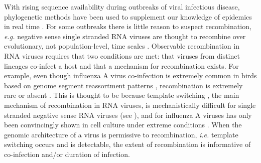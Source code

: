 \documentclass[11pt,oneside,letterpaper]{article}
\begin{document}
With rising sequence availability during outbreaks of viral infectious disease, phylogenetic methods have been used to supplement our knowledge of epidemics in real time \citep{smith_2009,rambaut_2009,lemey_2009,drosten_2013,cotten_2013,cotten_2014,drosten_2014,gire_2014}.
For some outbreaks there is little reason to suspect recombination, \textit{e.g.} negative sense single stranded RNA viruses are thought to recombine over evolutionary, not population-level, time scales \citep{chare_2003}.
Observable recombination in RNA viruses requires that two conditions are met: that viruses from distinct lineages co-infect a host and that a mechanism for recombination exists.
For example, even though influenza A virus co-infection is extremely common in birds based on genome segment reassortment patterns \citep{li_2004,dong_2011,lu_2014}, recombination is extremely rare or absent \citep{chare_2003,boni_2008}.
This is thought to be because template switching \citep{kirkegaard_1986,baric_1987}, the main mechanism of recombination in RNA viruses, is mechanistically difficult for single stranded negative sense RNA viruses (see \citealt{chare_2003}), and for influenza A viruses has only been convincingly shown in cell culture under extreme conditions \citep{mitnaul_2000}.
When the genomic architecture of a virus is permissive to recombination, \textit{i.e.} template switching occurs and is detectable, the extent of recombination is informative of co-infection and/or duration of infection.
\end{document}
